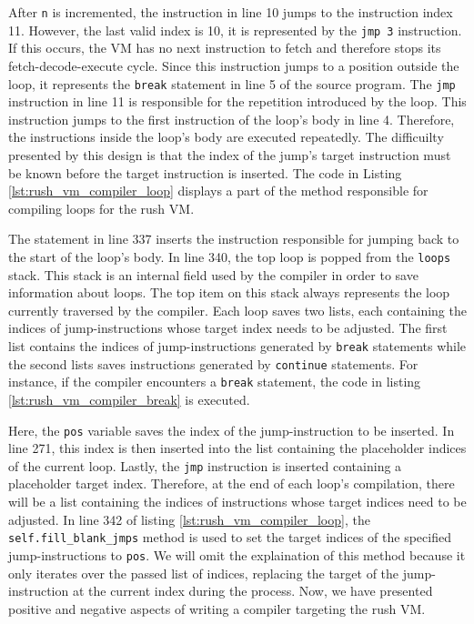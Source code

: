 After \texttt{n} is incremented, the instruction in line 10 jumps to the instruction index 11.
However, the last valid index is 10, it is represented by the \texttt{jmp 3} instruction.
If this occurs, the VM has no next instruction to fetch and therefore stops its fetch-decode-execute cycle.
Since this instruction jumps to a position outside the loop, it represents the \texttt{break} statement in line 5 of the source program.
The \texttt{jmp} instruction in line 11 is responsible for the repetition introduced by the loop.
This instruction jumps to the first instruction of the loop's body in line 4.
Therefore, the instructions inside the loop's body are executed repeatedly.
The difficuilty presented by this design is that the index of the jump's target instruction must be known before the target instruction is inserted.
The code in Listing \ref{lst:rush_vm_compiler_loop} displays a part of the method responsible for compiling loops for the rush VM.


The statement in line 337 inserts the instruction responsible for jumping back to the start of the loop's body.
In line 340, the top loop is popped from the \texttt{loops} stack.
This stack is an internal field used by the compiler in order to save information about loops.
The top item on this stack always represents the loop currently traversed by the compiler.
Each loop saves two lists, each containing the indices of jump-instructions whose target index needs to be adjusted.
The first list contains the indices of jump-instructions generated by \texttt{break} statements
while the second lists saves instructions generated by \texttt{continue} statements.
For instance, if the compiler encounters a \texttt{break} statement, the code in listing \ref{lst:rush_vm_compiler_break} is executed.


Here, the \texttt{pos} variable saves the index of the jump-instruction to be inserted.
In line 271, this index is then inserted into the list containing the placeholder indices of the current loop.
Lastly, the \texttt{jmp} instruction is inserted containing a placeholder target index.
Therefore, at the end of each loop's compilation, there will be a list containing the indices of instructions whose target indices need to be adjusted.
In line 342 of listing \ref{lst:rush_vm_compiler_loop}, the \texttt{self.fill\_blank\_jmps} method is used to set the target indices of the specified jump-instructions to \texttt{pos}.
We will omit the explaination of this method because it only iterates over the passed list of indices, replacing the target of the jump-instruction at the current index during the process.
Now, we have presented positive and negative aspects of writing a compiler targeting the rush VM.

